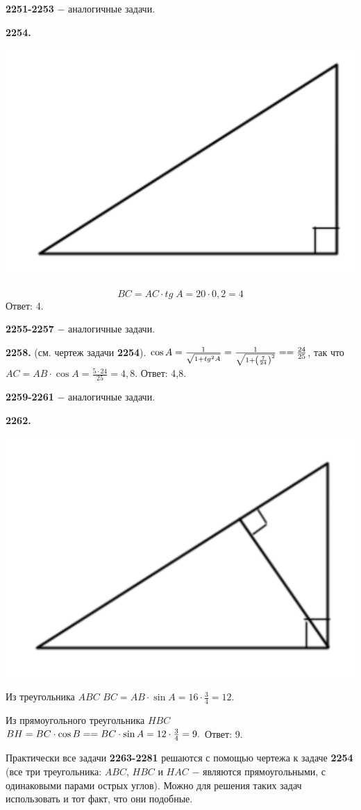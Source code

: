 \textbf{2251-2253} $-$ аналогичные задачи.

\textbf{2254.} 
 
{\centering \includegraphics[width=0.4\linewidth]{Geometry/Content/51.png}
	
}
\[
BC = AC\cdot tg\;A =20\cdot 0,2=4
\] \null \hspace*{\fill} Ответ: 4.

\textbf{2255-2257} $-$ аналогичные задачи.

\textbf{2258.} (см. чертеж задачи \textbf{2254}). $\cos{A}=\frac{1}{\sqrt{1+tg^2A}}=\frac{1}{\sqrt{1 + \left( \frac{7}{24} \right)^2}} = \linebreak= \frac{24}{25}$,  
так что $AC=AB\cdot\cos{A}=\frac{5\cdot24}{25}=4,8.$ \newline \null \hspace*{\fill} Ответ: 4,8.

\textbf{2259-2261} $-$ аналогичные задачи.

\textbf{2262.}

{\centering \includegraphics[width=0.4\linewidth]{Geometry/Content/52.png}
	
}

Из треугольника $ABC$ $BC=AB\cdot\sin{A}=16\cdot\frac{3}{4}=12$.

Из прямоугольного треугольника $HBC$ $BH=BC\cdot\cos{B}=\linebreak=BC\cdot\sin{A}=12\cdot\frac{3}{4}=9.$ \newline \null \hspace*{\fill} Ответ: 9.

Практически все задачи \textbf{2263-2281} решаются с помощью чертежа к задаче \textbf{2254} (все три треугольника: $ABC$, $HBC$ и $HAC$ $-$ являются прямоугольными, с одинаковыми парами острых углов). Можно для решения таких задач использовать и тот факт, что они подобные. 


